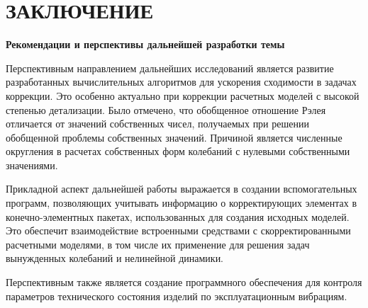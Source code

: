 
\chapter*{ЗАКЛЮЧЕНИЕ} 



\textbf{Рекомендации и перспективы дальнейшей разработки темы}

Перспективным направлением дальнейших исследований является развитие разработанных вычислительных алгоритмов для ускорения сходимости в задачах коррекции. Это особенно актуально при коррекции расчетных моделей с высокой степенью детализации. Было отмечено, что обобщенное отношение Рэлея отличается от значений собственных чисел, получаемых при решении обобщенной проблемы собственных значений. Причиной является численные округления в расчетах собственных форм колебаний с нулевыми собственными значениями.

Прикладной аспект дальнейшей работы выражается в создании вспомогательных программ, позволяющих учитывать информацию о корректирующих элементах в конечно-элементных пакетах, использованных для создания исходных моделей. Это обеспечит взаимодействие встроенными средствами с скорректированными расчетными моделями, в том числе их применение для решения задач вынужденных колебаний и нелинейной динамики.

Перспективным также является создание программного обеспечения для контроля параметров технического состояния изделий по эксплуатационным вибрациям.